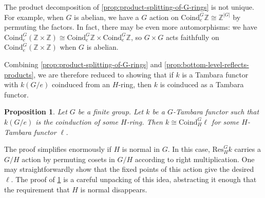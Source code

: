 \documentclass[11pt,dvipsnames]{amsart}
\newcommand{\Z}{\mathbb{Z}}
\newtheorem{proposition}[theorem]{Proposition}
\theoremstyle{BoldRemark}
\begin{document}
The product decomposition of \cref{prop:product-splitting-of-G-rings} is not unique. For example, when $G$ is abelian, we have a $G$ action on $\mathrm{Coind}_e^G \Z \cong \Z^{|G|}$ by permuting the factors. In fact, there may be even more automorphisms: we have $\mathrm{Coind}_e^G \left( \Z \times \Z \right) \cong \mathrm{Coind}_e^G \Z \times \mathrm{Coind}_e^G \Z$, so $G \times G$ acts faithfully on $\mathrm{Coind}_e^G \left( \Z \times \Z \right)$ when $G$ is abelian.

Combining \cref{prop:product-splitting-of-G-rings} and \cref{prop:bottom-level-reflects-products}, we are therefore reduced to showing that if $k$ is a Tambara functor with $k(G/e)$ coinduced from an $H$-ring, then $k$ is coinduced as a Tambara functor.

\begin{proposition}\label{prop:coinduction-is-detected-at-bottom}
	Let $G$ be a finite group. Let $k$ be a $G$-Tambara functor such that $k(G/e)$ is the coinduction of some $H$-ring. Then $k \cong \mathrm{Coind}_H^G \ell$ for some $H$-Tambara functor $\ell$.
\end{proposition}

The proof simplifies enormously if $H$ is normal in $G$. In this case, $\mathrm{Res}_H^G k$ carries a $G/H$ action by permuting cosets in $G/H$ according to right multiplication. One may straightforwardly show that the fixed points of this action give the desired $\ell$. The proof of \cref{prop:coinduction-is-detected-at-bottom} is a careful unpacking of this idea, abstracting it enough that the requirement that $H$ is normal disappears.
\end{document}
